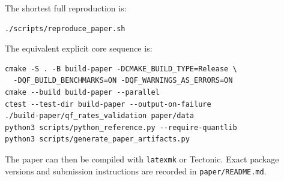 \documentclass[11pt]{article}
\numberwithin{equation}{section}
\theoremstyle{definition}
\theoremstyle{remark}
\begin{document}
The shortest full reproduction is:
\begin{verbatim}
./scripts/reproduce_paper.sh
\end{verbatim}
The equivalent explicit core sequence is:
\begin{verbatim}
cmake -S . -B build-paper -DCMAKE_BUILD_TYPE=Release \
  -DQF_BUILD_BENCHMARKS=ON -DQF_WARNINGS_AS_ERRORS=ON
cmake --build build-paper --parallel
ctest --test-dir build-paper --output-on-failure
./build-paper/qf_rates_validation paper/data
python3 scripts/python_reference.py --require-quantlib
python3 scripts/generate_paper_artifacts.py
\end{verbatim}
The paper can then be compiled with \texttt{latexmk} or Tectonic. Exact package
versions and submission instructions are recorded in \texttt{paper/README.md}.



\end{document}
